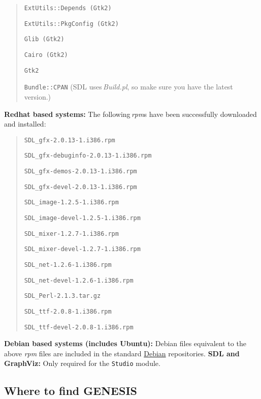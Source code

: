 \documentclass[12pt]{article}
\begin{document}
\begin{enumerate}
\begin{quote}
\item {\tt ExtUtils::Depends (Gtk2)}
\item {\tt ExtUtils::PkgConfig (Gtk2)}
\item {\tt Glib (Gtk2)}
\item {\tt Cairo (Gtk2)}
\item {\tt Gtk2}

\item {\tt Bundle::CPAN} (SDL uses\,{\it Build.pl}, so make sure you have the latest version.) 
\end{quote}
{\bf Redhat based systems:} The following\,{\it rpm}s have been successfully downloaded and installed:

\begin{quote}
\item {\tt SDL\_gfx-2.0.13-1.i386.rpm}
\item {\tt SDL\_gfx-debuginfo-2.0.13-1.i386.rpm}
\item {\tt SDL\_gfx-demos-2.0.13-1.i386.rpm}
\item {\tt SDL\_gfx-devel-2.0.13-1.i386.rpm}
\item {\tt SDL\_image-1.2.5-1.i386.rpm}
\item {\tt SDL\_image-devel-1.2.5-1.i386.rpm}
\item {\tt SDL\_mixer-1.2.7-1.i386.rpm}
\item {\tt SDL\_mixer-devel-1.2.7-1.i386.rpm}
\item {\tt SDL\_net-1.2.6-1.i386.rpm}
\item {\tt SDL\_net-devel-1.2.6-1.i386.rpm}
\item {\tt SDL\_Perl-2.1.3.tar.gz}
\item {\tt SDL\_ttf-2.0.8-1.i386.rpm}
\item {\tt SDL\_ttf-devel-2.0.8-1.i386.rpm}
\end{quote}
{\bf Debian based systems (includes Ubuntu):} Debian files equivalent to the above {\it rpm} files are included in the standard \href{http://www.debian.org/}{Debian} repositories.
 {\bf SDL and GraphViz: } Only required for the {\tt Studio} module.
\end{enumerate}

\subsection*{Where to find GENESIS}

\end{document}
